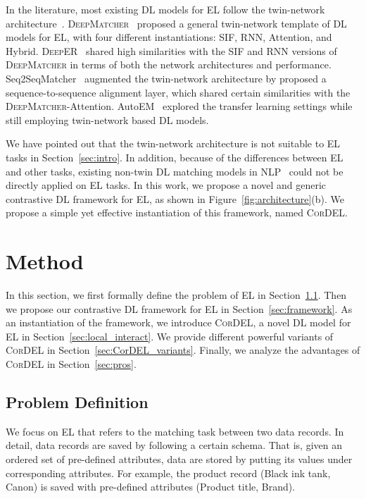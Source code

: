 \documentclass[conference]{IEEEtran}
\begin{document}
In the literature, most existing DL models for EL follow the twin-network architecture~\cite{mudgal2018deep,ebraheem2018distributed,nie2019deep,zhao2019auto}. \textsc{DeepMatcher}~\cite{mudgal2018deep} proposed a general twin-network template of DL models for EL, with four different instantiations: SIF, RNN, Attention, and Hybrid. \textsc{DeepER}~\cite{ebraheem2018distributed} shared high similarities with the SIF and RNN versions of \textsc{DeepMatcher} in terms of both the network architectures and performance. Seq2SeqMatcher~\cite{nie2019deep} augmented the twin-network architecture by proposed a sequence-to-sequence alignment layer, which shared certain similarities with the \textsc{DeepMatcher}-Attention. AutoEM~\cite{zhao2019auto} explored the transfer learning settings while still employing twin-network based DL models.

We have pointed out that the twin-network architecture is not suitable to EL tasks in Section~\ref{sec:intro}. In addition, because of the differences between EL and other tasks, existing non-twin DL matching models in NLP~\cite{lu2013deep,guo2016deep,pang2016text} could not be directly applied on EL tasks. In this work, we propose a novel and generic contrastive DL framework for EL, as shown in Figure~\ref{fig:architecture}(b). We propose a simple yet effective instantiation of this framework, named \textsc{CorDEL}.

\section{Method}\label{sec:method}

In this section, we first formally define the problem of EL in Section~\ref{sec:problem_def}. Then we propose our contrastive DL framework for EL in Section~\ref{sec:framework}. As an instantiation of the framework, we introduce \textsc{CorDEL}, a novel DL model for EL in Section~\ref{sec:local_interact}. We provide different powerful variants of \textsc{CorDEL} in Section~\ref{sec:CorDEL_variants}. Finally, we analyze the advantages of \textsc{CorDEL} in Section~\ref{sec:pros}.

\subsection{Problem Definition}\label{sec:problem_def}

We focus on EL that refers to the matching task between two data records. In detail, data records are saved by following a certain schema. That is, given an ordered set of pre-defined attributes, data are stored by putting its values under corresponding attributes. For example, the product record (Black ink tank, Canon) is saved with pre-defined attributes (Product title, Brand).
\end{document}
